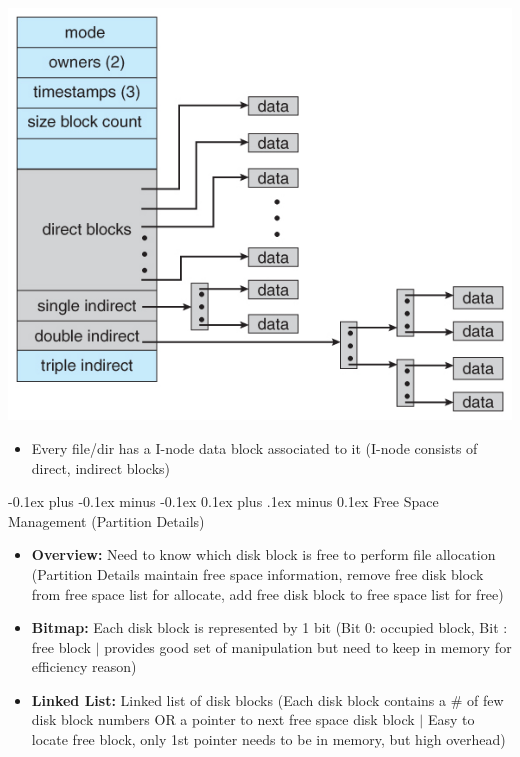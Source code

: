\documentclass[landscape]{article}
\makeatletter
\renewcommand{\subsection}{\@startsection{subsection}{2}{0mm}%
  {-0.1ex plus -0.1ex minus -0.1ex}%
  {0.1ex plus .1ex minus 0.1ex}%
{\normalfont\scriptsize\bfseries}}
\makeatother
\begin{document}
\begin{multicols*}{6}
\begin{enumerate}
\begin{itemize}
        \includegraphics[width=0.8\linewidth]{22_unix_inode.jpeg}
        \begin{itemize}
          \item Every file/dir has a I-node data block associated to it (I-node consists of direct, indirect blocks)
        \end{itemize}
      \end{itemize}
    \end{enumerate}

    \subsection{Free Space Management (Partition Details)}
    \begin{itemize}
      \item \textbf{Overview:} Need to know which disk block is free to perform file allocation (Partition Details maintain free space information, remove free disk block from free space list for allocate, add free disk block to free space list for free)
      \item \textbf{Bitmap:} Each disk block is represented by 1 bit (Bit 0: occupied block, Bit : free block $\vert$ provides good set of manipulation but need to keep in memory for efficiency reason)
      \item \textbf{Linked List:} Linked list of disk blocks (Each disk block contains a \# of few disk block numbers OR a pointer to next free space disk block $\vert$ Easy to locate free block, only 1st pointer needs to be in memory, but high overhead)
    \end{itemize}


\end{multicols*}
\end{document}
